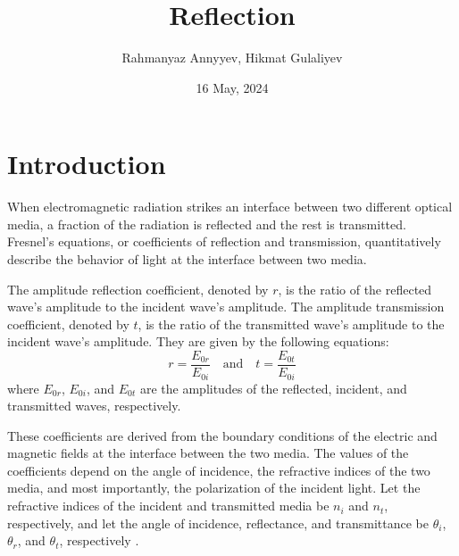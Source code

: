 \documentclass[10pt]{article}
\title{Reflection}
\author{Rahmanyaz Annyyev, Hikmat Gulaliyev}
\date{16 May, 2024}
\begin{document}
\maketitle

\begin{abstract}

\end{abstract}

\section{Introduction}

When electromagnetic radiation strikes an interface between two different optical media, a fraction of the radiation is reflected and the rest is transmitted. Fresnel's equations, or coefficients of reflection and transmission, quantitatively describe the behavior of light at the interface between two media. 

The amplitude reflection coefficient, denoted by $r$, is the ratio of the reflected wave's amplitude to the incident wave's amplitude. The amplitude transmission coefficient, denoted by $t$, is the ratio of the transmitted wave's amplitude to the incident wave's amplitude. They are given by the following equations:
\begin{equation}
  r = \frac{E_{0r}}{E_{0i}} \quad \text{and} \quad t = \frac{E_{0t}}{E_{0i}}
\end{equation}
where $E_{0r}$, $E_{0i}$, and $E_{0t}$ are the amplitudes of the reflected, incident, and transmitted waves, respectively.

These coefficients are derived from the boundary conditions of the electric and magnetic fields at the interface between the two media. The values of the coefficients depend on the angle of incidence, the refractive indices of the two media, and most importantly, the polarization of the incident light. Let the refractive indices of the incident and transmitted media be $n_i$ and $n_t$, respectively, and let the angle of incidence, reflectance, and transmittance be $\theta_i$, $\theta_r$, and $\theta_t$, respectively \cite{Pedrotti_2006}.
\end{document}
